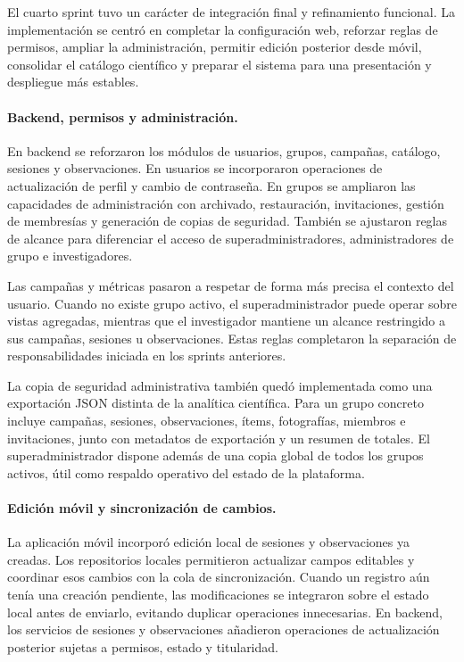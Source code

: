 El cuarto sprint tuvo un carácter de integración final y refinamiento funcional.
La implementación se centró en completar la configuración web, reforzar reglas
de permisos, ampliar la administración, permitir edición posterior desde móvil,
consolidar el catálogo científico y preparar el sistema para una presentación y
despliegue más estables.

\paragraph{Backend, permisos y administración.}
En backend se reforzaron los módulos de usuarios, grupos, campañas, catálogo,
sesiones y observaciones. En usuarios se incorporaron operaciones de
actualización de perfil y cambio de contraseña. En grupos se ampliaron las
capacidades de administración con archivado, restauración, invitaciones,
gestión de membresías y generación de copias de seguridad. También se ajustaron
reglas de alcance para diferenciar el acceso de superadministradores,
administradores de grupo e investigadores.

Las campañas y métricas pasaron a respetar de forma más precisa el contexto del
usuario. Cuando no existe grupo activo, el superadministrador puede operar sobre
vistas agregadas, mientras que el investigador mantiene un alcance restringido a
sus campañas, sesiones u observaciones. Estas reglas completaron la separación
de responsabilidades iniciada en los sprints anteriores.

La copia de seguridad administrativa también quedó implementada como una
exportación JSON distinta de la analítica científica. Para un grupo concreto
incluye campañas, sesiones, observaciones, ítems, fotografías, miembros e
invitaciones, junto con metadatos de exportación y un resumen de totales. El
superadministrador dispone además de una copia global de todos los grupos
activos, útil como respaldo operativo del estado de la plataforma.

\paragraph{Edición móvil y sincronización de cambios.}
La aplicación móvil incorporó edición local de sesiones y observaciones ya
creadas. Los repositorios locales permitieron actualizar campos editables y
coordinar esos cambios con la cola de sincronización. Cuando un registro aún
tenía una creación pendiente, las modificaciones se integraron sobre el estado
local antes de enviarlo, evitando duplicar operaciones innecesarias. En backend,
los servicios de sesiones y observaciones añadieron operaciones de actualización
posterior sujetas a permisos, estado y titularidad.

